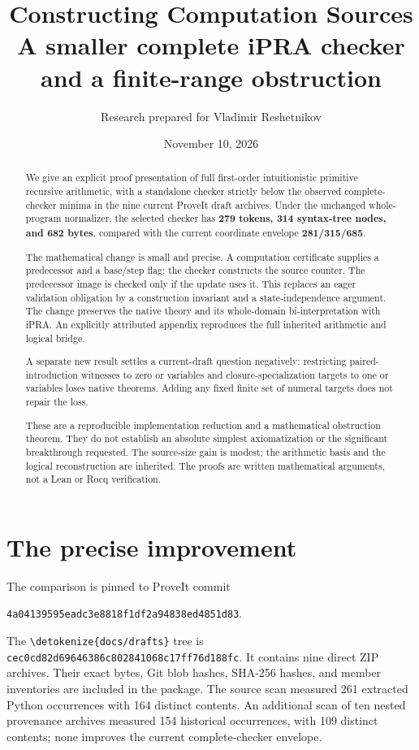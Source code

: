 \documentclass[11pt,letterpaper]{article}
\title{\color{ink}\textbf{Constructing Computation Sources}\\[.5em]
\large A smaller complete iPRA checker and a finite-range obstruction}
\author{Research prepared for Vladimir Reshetnikov}
\date{November 10, 2026}
\theoremstyle{definition}\newtheorem{definition}[theorem]{Definition}
\theoremstyle{remark}\newtheorem{remark}[theorem]{Remark}
\newcommand{\file}[1]{\expandafter\nolinkurl\expandafter{\detokenize{#1}}}
\begin{document}
\maketitle
\begin{abstract}
We give an explicit proof presentation of full first-order intuitionistic
primitive recursive arithmetic, with a standalone checker strictly below
the observed complete-checker minima in the nine current ProveIt draft
archives. Under the unchanged whole-program normalizer, the selected
checker has \textbf{279 tokens, 314 syntax-tree nodes, and 682 bytes},
compared with the current coordinate envelope \textbf{281/315/685}.

The mathematical change is small and precise. A computation certificate
supplies a predecessor and a base/step flag; the checker constructs the
source counter. The predecessor image is checked only if the update uses
it. This replaces an eager validation obligation by a construction
invariant and a state-independence argument. The change preserves the
native theory and its whole-domain bi-interpretation with iPRA. An
explicitly attributed appendix reproduces the full inherited arithmetic
and logical bridge.

A separate new result settles a current-draft question negatively:
restricting paired-introduction witnesses to zero or variables and
closure-specialization targets to one or variables loses native theorems.
Adding any fixed finite set of numeral targets does not repair the loss.

These are a reproducible implementation reduction and a mathematical
obstruction theorem. They do not establish an absolute simplest
axiomatization or the significant breakthrough requested. The source-size
gain is modest; the arithmetic basis and the logical reconstruction are
inherited. The proofs are written mathematical arguments, not a
Lean or Rocq verification.
\end{abstract}
\clearpage
\setcounter{tocdepth}{1}\tableofcontents
\clearpage

\section{The precise improvement}
\label{sec:comparison}

The comparison is pinned to ProveIt commit
\begin{center}\small\texttt{4a04139595eadc3e8818f1df2a94838ed4851d83}.\end{center}
The \file{docs/drafts} tree is
\texttt{cec0cd82d69646386c802841068c17ff76d188fc}.
It contains nine direct ZIP archives\cite{snapshot}. Their exact bytes,
Git blob hashes, SHA-256 hashes, and member inventories are included in
the package. The source scan measured 261 extracted Python occurrences
with 164 distinct contents. An additional scan of ten nested provenance
archives measured 154 historical occurrences, with 109 distinct contents;
none improves the current complete-checker envelope.
\end{document}
